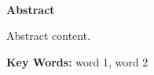 
\pagestyle{artimain}

\ \\\vspace*{-3.5em}
\begin{center}
\textbf{Abstract}
\end{center}

\vspace{0.5em} 

	\par Abstract content.
	
\vspace{2em}\par\noindent\textbf{ Key Words: }word 1, word 2